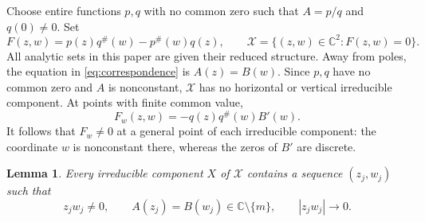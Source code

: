 \documentclass[11pt]{article}
\newtheorem{lemma}[theorem]{Lemma}
\theoremstyle{remark}
\numberwithin{equation}{section}
\newcommand{\C}{\mathbb C}
\newcommand{\X}{\mathcal X}
\begin{document}
Choose entire functions \(p,q\) with no common zero such that
\(A=p/q\) and \(q(0)\ne0\). Set
\begin{equation}\label{eq:correspondence}
 F(z,w)=p(z)q^\#(w)-p^\#(w)q(z),
 \qquad \X=\{(z,w)\in\C^2:F(z,w)=0\}.
\end{equation}
All analytic sets in this paper are given their reduced structure.
Away from poles, the equation in \eqref{eq:correspondence} is
\(A(z)=B(w)\).
Since \(p,q\) have no common zero and \(A\) is nonconstant,
\(\X\) has no horizontal or vertical irreducible component.
At points with finite common value,
\[
 F_w(z,w)=-q(z)q^\#(w)B'(w).
\]
It follows that \(F_w\ne0\) at a general point of each irreducible
component: the coordinate \(w\) is nonconstant there, whereas the
zeros of \(B'\) are discrete.

\begin{lemma}\label{lem:small-products}
Every irreducible component \(X\) of \(\X\) contains a sequence
\((z_j,w_j)\) such that
\begin{equation}\label{eq:small-products}
 z_jw_j\ne0,\qquad
 A(z_j)=B(w_j)\in\C\setminus\{m\},
 \qquad |z_jw_j|\longrightarrow0.
\end{equation}
\end{lemma}
\end{document}

